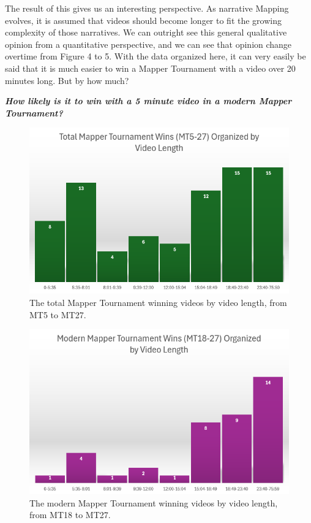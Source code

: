 \documentclass[letterpaper,twocolumn,amsmath,amssymb,prl,nolongbibliography,url,reprint]{revtex4-2}
\begin{document}
The result of this gives us an interesting perspective. As narrative Mapping evolves, it is assumed that videos should become longer to fit the growing complexity of those narratives. We can outright see this general qualitative opinion from a quantitative perspective, and we can see that opinion change overtime from Figure 4 to 5. With the data organized here, it can very easily be said that it is much easier to win a Mapper Tournament with a video over 20 minutes long. But by how much?

\textbf{\emph{How likely is it to win with a 5 minute video in a modern Mapper Tournament?}}

\begin{figure}
\includegraphics[width=1\linewidth]{fiveto27.png}
\caption{
\label{fg:acret} The total Mapper Tournament winning videos by video length, from MT5 to MT27.
}
\end{figure}

\begin{figure}
\includegraphics[width=1\linewidth]{eighteento27.png}
\caption{
\label{fg:acret} The modern Mapper Tournament winning videos by video length, from MT18 to MT27.
}
\end{figure}
\end{document}
